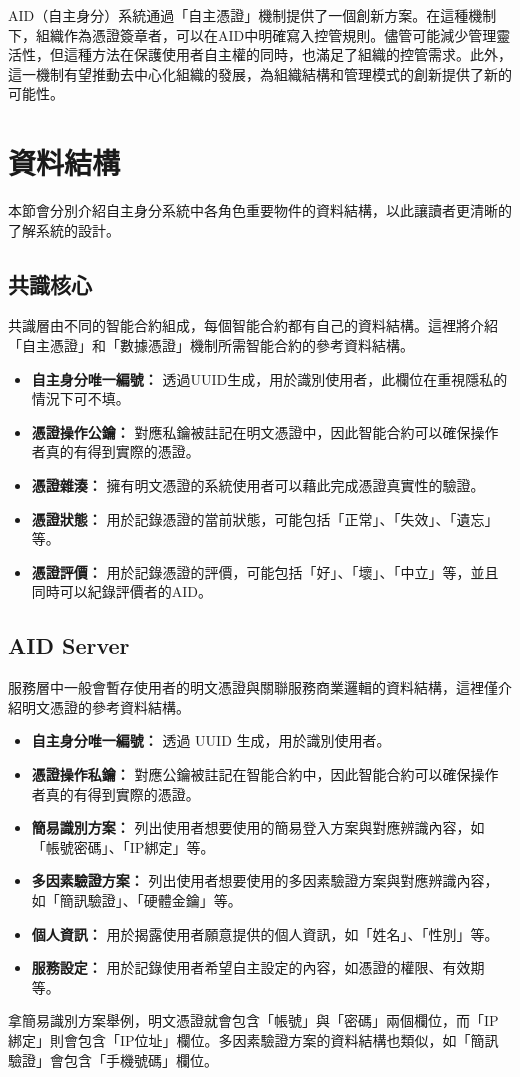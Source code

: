 AID（自主身分）系統通過「自主憑證」機制提供了一個創新方案。在這種機制下，組織作為憑證簽章者，可以在AID中明確寫入控管規則。儘管可能減少管理靈活性，但這種方法在保護使用者自主權的同時，也滿足了組織的控管需求。此外，這一機制有望推動去中心化組織的發展，為組織結構和管理模式的創新提供了新的可能性。
\section{資料結構}
本節會分別介紹自主身分系統中各角色重要物件的資料結構，以此讓讀者更清晰的了解系統的設計。
\subsection{共識核心}
共識層由不同的智能合約組成，每個智能合約都有自己的資料結構。這裡將介紹「自主憑證」和「數據憑證」機制所需智能合約的參考資料結構。
\begin{itemize}
  \item \textbf{自主身分唯一編號：} 透過UUID生成，用於識別使用者，此欄位在重視隱私的情況下可不填。
  \item \textbf{憑證操作公鑰：} 對應私鑰被註記在明文憑證中，因此智能合約可以確保操作者真的有得到實際的憑證。
  \item \textbf{憑證雜湊：} 擁有明文憑證的系統使用者可以藉此完成憑證真實性的驗證。
  \item \textbf{憑證狀態：} 用於記錄憑證的當前狀態，可能包括「正常」、「失效」、「遺忘」等。
  \item \textbf{憑證評價：} 用於記錄憑證的評價，可能包括「好」、「壞」、「中立」等，並且同時可以紀錄評價者的AID。
\end{itemize}
\subsection{AID Server}
服務層中一般會暫存使用者的明文憑證與關聯服務商業邏輯的資料結構，這裡僅介紹明文憑證的參考資料結構。
\begin{itemize}
  \item \textbf{自主身分唯一編號：} 透過 UUID 生成，用於識別使用者。
  \item \textbf{憑證操作私鑰：} 對應公鑰被註記在智能合約中，因此智能合約可以確保操作者真的有得到實際的憑證。
  \item \textbf{簡易識別方案：} 列出使用者想要使用的簡易登入方案與對應辨識內容，如「帳號密碼」、「IP綁定」等。
  \item \textbf{多因素驗證方案：} 列出使用者想要使用的多因素驗證方案與對應辨識內容，如「簡訊驗證」、「硬體金鑰」等。
  \item \textbf{個人資訊：} 用於揭露使用者願意提供的個人資訊，如「姓名」、「性別」等。
  \item \textbf{服務設定：} 用於記錄使用者希望自主設定的內容，如憑證的權限、有效期等。
\end{itemize}
拿簡易識別方案舉例，明文憑證就會包含「帳號」與「密碼」兩個欄位，而「IP綁定」則會包含「IP位址」欄位。多因素驗證方案的資料結構也類似，如「簡訊驗證」會包含「手機號碼」欄位。

